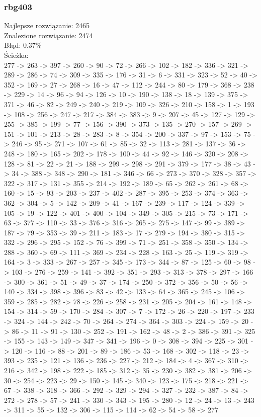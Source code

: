 \documentclass[12pt]{article}
\begin{document}
\subsubsection{rbg403}
Najlepsze rozwiązanie: 2465\\
Znalezione rozwiązanie: 2474\\
Błąd: 0.37\%\\
Ścieżka:\\
\tiny
277 -> 263 -> 397 -> 260 -> 90 -> 72 -> 266 -> 102 -> 182 -> 336 -> 321 -> 289 -> 286 -> 74 -> 309 -> 335 -> 176 -> 31 -> 6 -> 331 -> 323 -> 52 -> 40 -> 352 -> 169 -> 27 -> 268 -> 16 -> 47 -> 112 -> 244 -> 80 -> 179 -> 368 -> 238 -> 229 -> 14 -> 96 -> 94 -> 126 -> 10 -> 190 -> 138 -> 18 -> 139 -> 375 -> 371 -> 46 -> 82 -> 249 -> 240 -> 219 -> 109 -> 326 -> 210 -> 158 -> 1 -> 193 -> 108 -> 256 -> 247 -> 217 -> 384 -> 383 -> 9 -> 207 -> 45 -> 127 -> 129 -> 255 -> 385 -> 199 -> 77 -> 156 -> 390 -> 373 -> 135 -> 270 -> 157 -> 269 -> 151 -> 101 -> 213 -> 28 -> 283 -> 8 -> 354 -> 200 -> 337 -> 97 -> 153 -> 75 -> 246 -> 95 -> 271 -> 107 -> 61 -> 85 -> 32 -> 113 -> 281 -> 137 -> 36 -> 248 -> 180 -> 165 -> 202 -> 178 -> 100 -> 44 -> 92 -> 146 -> 320 -> 208 -> 128 -> 81 -> 22 -> 21 -> 188 -> 299 -> 298 -> 291 -> 379 -> 177 -> 38 -> 43 -> 34 -> 388 -> 348 -> 290 -> 181 -> 346 -> 66 -> 273 -> 370 -> 328 -> 357 -> 322 -> 317 -> 131 -> 355 -> 214 -> 192 -> 189 -> 65 -> 262 -> 261 -> 68 -> 160 -> 15 -> 93 -> 203 -> 237 -> 402 -> 287 -> 395 -> 253 -> 374 -> 363 -> 362 -> 304 -> 5 -> 142 -> 209 -> 41 -> 167 -> 239 -> 117 -> 124 -> 339 -> 105 -> 19 -> 122 -> 401 -> 400 -> 104 -> 349 -> 305 -> 215 -> 73 -> 171 -> 63 -> 377 -> 110 -> 33 -> 376 -> 316 -> 265 -> 275 -> 147 -> 99 -> 389 -> 187 -> 79 -> 353 -> 39 -> 211 -> 183 -> 17 -> 279 -> 194 -> 380 -> 315 -> 332 -> 296 -> 295 -> 152 -> 76 -> 399 -> 71 -> 251 -> 358 -> 350 -> 134 -> 288 -> 360 -> 69 -> 111 -> 369 -> 234 -> 228 -> 163 -> 25 -> 119 -> 319 -> 164 -> 3 -> 333 -> 267 -> 257 -> 345 -> 173 -> 344 -> 87 -> 125 -> 60 -> 98 -> 103 -> 276 -> 259 -> 141 -> 392 -> 351 -> 293 -> 313 -> 378 -> 297 -> 166 -> 300 -> 361 -> 51 -> 49 -> 37 -> 174 -> 250 -> 372 -> 356 -> 50 -> 56 -> 140 -> 334 -> 398 -> 396 -> 83 -> 42 -> 133 -> 64 -> 365 -> 245 -> 106 -> 359 -> 285 -> 282 -> 78 -> 226 -> 258 -> 231 -> 205 -> 204 -> 161 -> 148 -> 154 -> 314 -> 59 -> 170 -> 284 -> 307 -> 7 -> 172 -> 26 -> 220 -> 197 -> 233 -> 324 -> 144 -> 242 -> 70 -> 264 -> 274 -> 364 -> 303 -> 224 -> 159 -> 20 -> 86 -> 11 -> 91 -> 130 -> 252 -> 191 -> 162 -> 48 -> 2 -> 386 -> 391 -> 325 -> 155 -> 143 -> 149 -> 347 -> 341 -> 196 -> 0 -> 308 -> 394 -> 225 -> 301 -> 120 -> 116 -> 88 -> 201 -> 89 -> 186 -> 53 -> 168 -> 302 -> 118 -> 23 -> 393 -> 235 -> 121 -> 136 -> 236 -> 227 -> 212 -> 184 -> 4 -> 367 -> 310 -> 216 -> 342 -> 198 -> 222 -> 185 -> 312 -> 35 -> 230 -> 382 -> 381 -> 206 -> 30 -> 254 -> 223 -> 29 -> 150 -> 145 -> 340 -> 123 -> 175 -> 218 -> 221 -> 67 -> 338 -> 318 -> 366 -> 292 -> 329 -> 294 -> 327 -> 232 -> 387 -> 84 -> 272 -> 278 -> 57 -> 241 -> 330 -> 343 -> 195 -> 280 -> 12 -> 24 -> 13 -> 243 -> 311 -> 55 -> 132 -> 306 -> 115 -> 114 -> 62 -> 54 -> 58 -> 277
\normalsize
\end{document}
